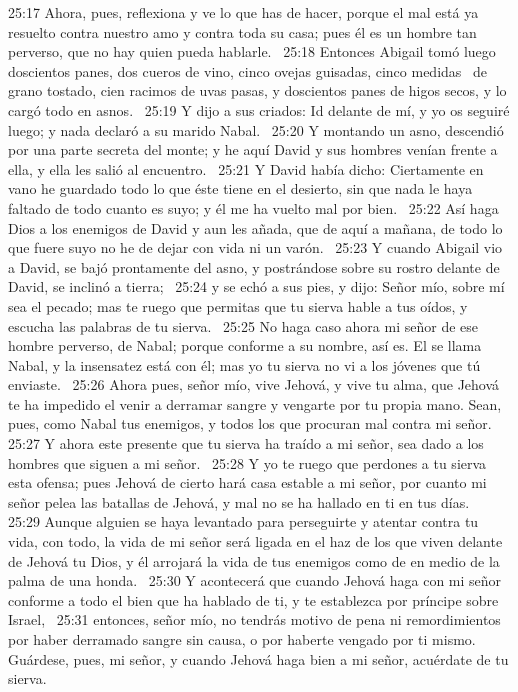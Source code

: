 25:17 Ahora, pues, reflexiona y ve lo que has de hacer, porque el mal está ya resuelto contra nuestro amo y contra toda su casa; pues él es un hombre tan perverso, que no hay quien pueda hablarle.  
25:18 Entonces Abigail tomó luego doscientos panes, dos cueros de vino, cinco ovejas guisadas, cinco medidas  de grano tostado, cien racimos de uvas pasas, y doscientos panes de higos secos, y lo cargó todo en asnos.  
25:19 Y dijo a sus criados: Id delante de mí, y yo os seguiré luego; y nada declaró a su marido Nabal.  
25:20 Y montando un asno, descendió por una parte secreta del monte; y he aquí David y sus hombres venían frente a ella, y ella les salió al encuentro.  
25:21 Y David había dicho: Ciertamente en vano he guardado todo lo que éste tiene en el desierto, sin que nada le haya faltado de todo cuanto es suyo; y él me ha vuelto mal por bien.  
25:22 Así haga Dios a los enemigos de David y aun les añada, que de aquí a mañana, de todo lo que fuere suyo no he de dejar con vida ni un varón.  
25:23 Y cuando Abigail vio a David, se bajó prontamente del asno, y postrándose sobre su rostro delante de David, se inclinó a tierra;  
25:24 y se echó a sus pies, y dijo: Señor mío, sobre mí sea el pecado; mas te ruego que permitas que tu sierva hable a tus oídos, y escucha las palabras de tu sierva.  
25:25 No haga caso ahora mi señor de ese hombre perverso, de Nabal; porque conforme a su nombre, así es. El se llama Nabal, y la insensatez está con él; mas yo tu sierva no vi a los jóvenes que tú enviaste.  
25:26 Ahora pues, señor mío, vive Jehová, y vive tu alma, que Jehová te ha impedido el venir a derramar sangre y vengarte por tu propia mano. Sean, pues, como Nabal tus enemigos, y todos los que procuran mal contra mi señor.  
25:27 Y ahora este presente que tu sierva ha traído a mi señor, sea dado a los hombres que siguen a mi señor.  
25:28 Y yo te ruego que perdones a tu sierva esta ofensa; pues Jehová de cierto hará casa estable a mi señor, por cuanto mi señor pelea las batallas de Jehová, y mal no se ha hallado en ti en tus días.  
25:29 Aunque alguien se haya levantado para perseguirte y atentar contra tu vida, con todo, la vida de mi señor será ligada en el haz de los que viven delante de Jehová tu Dios, y él arrojará la vida de tus enemigos como de en medio de la palma de una honda.  
25:30 Y acontecerá que cuando Jehová haga con mi señor conforme a todo el bien que ha hablado de ti, y te establezca por príncipe sobre Israel,  
25:31 entonces, señor mío, no tendrás motivo de pena ni remordimientos por haber derramado sangre sin causa, o por haberte vengado por ti mismo. Guárdese, pues, mi señor, y cuando Jehová haga bien a mi señor, acuérdate de tu sierva.  
